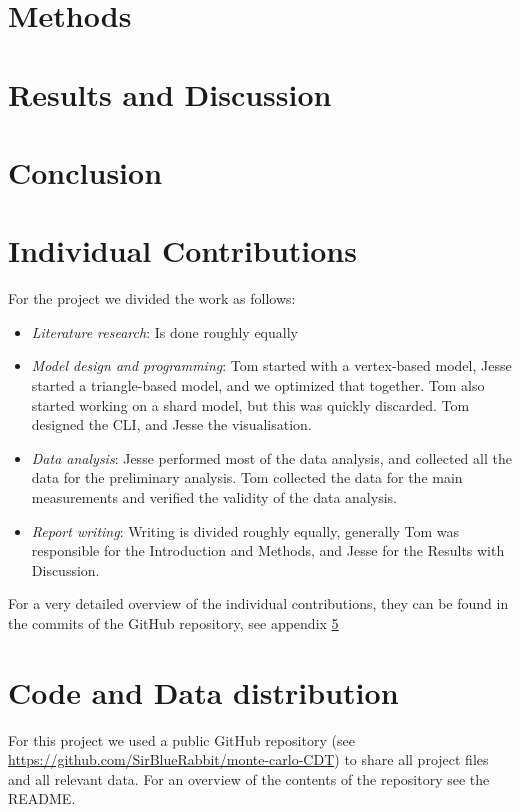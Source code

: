 \documentclass{article}
\begin{document}
\section{Methods}


\section{Results and Discussion}


\section{Conclusion}


\printbibliography

\appendix
\section{Individual Contributions}
For the project we divided the work as follows:
\begin{itemize}
    \item \textit{Literature research}: Is done roughly equally
    \item \textit{Model design and programming}: Tom started with a vertex-based model, Jesse started a triangle-based model, and we optimized that together. Tom also started working on a shard model, but this was quickly discarded. Tom designed the CLI, and Jesse the visualisation.
    \item \textit{Data analysis}: Jesse performed most of the data analysis, and collected all the data for the preliminary analysis. Tom collected the data for the main measurements and verified the validity of the data analysis.
    \item \textit{Report writing}: Writing is divided roughly equally, generally Tom was responsible for the Introduction and Methods, and Jesse for the Results with Discussion.
\end{itemize}
For a very detailed overview of the individual contributions, they can be found in the commits of the GitHub repository, see appendix \ref{sec:coderepo}

\section{Code and Data distribution} \label{sec:coderepo}
For this project we used a public GitHub repository (see \url{https://github.com/SirBlueRabbit/monte-carlo-CDT}) to share all project files and all relevant data.
For an overview of the contents of the repository see the \textsc{README}.
\end{document}
